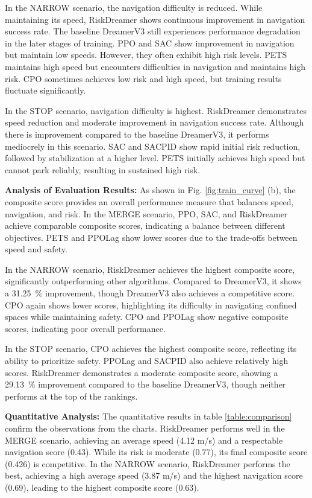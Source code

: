 In the NARROW scenario, the navigation difficulty is reduced. While maintaining its speed, RiskDreamer shows continuous improvement in navigation success rate. The baseline DreamerV3 still experiences performance degradation in the later stages of training. PPO and SAC show improvement in navigation but maintain low speeds. However, they often exhibit high risk levels. PETS maintains high speed but encounters difficulties in navigation and maintains high risk. CPO sometimes achieves low risk and high speed, but training results fluctuate significantly.

In the STOP scenario, navigation difficulty is highest. RiskDreamer demonstrates speed reduction and moderate improvement in navigation success rate. Although there is improvement compared to the baseline DreamerV3, it performs mediocrely in this scenario. SAC and SACPID show rapid initial risk reduction, followed by stabilization at a higher level. PETS initially achieves high speed but cannot park reliably, resulting in sustained high risk.


\textbf{Analysis of Evaluation Results:}
As shown in Fig. \ref{fig:train_curve} (b), the composite score provides an overall performance measure that balances speed, navigation, and risk. In the MERGE scenario, PPO, SAC, and RiskDreamer achieve comparable composite scores, indicating a balance between different objectives. PETS and PPOLag show lower scores due to the trade-offs between speed and safety.

In the NARROW scenario, RiskDreamer achieves the highest composite score, significantly outperforming other algorithms. Compared to DreamerV3, it shows a \SI{31.25}{\%} improvement, though DreamerV3 also achieves a competitive score. CPO again shows lower scores, highlighting its difficulty in navigating confined spaces while maintaining safety. CPO and PPOLag show negative composite scores, indicating poor overall performance.

In the STOP scenario, CPO achieves the highest composite score, reflecting its ability to prioritize safety. PPOLag and SACPID also achieve relatively high scores. RiskDreamer demonstrates a moderate composite score, showing a \SI{29.13}{\%} improvement compared to the baseline DreamerV3, though neither performs at the top of the rankings.

\textbf{Quantitative Analysis:}
The quantitative results in table \ref{table:comparison} confirm the observations from the charts. RiskDreamer performs well in the MERGE scenario, achieving an average speed (4.12 \si{m/s}) and a respectable navigation score (0.43). While its risk is moderate (0.77), its final composite score (0.426) is competitive. In the NARROW scenario, RiskDreamer performs the best, achieving a high average speed (3.87 \si{m/s}) and the highest navigation score (0.69), leading to the highest composite score (0.63).

